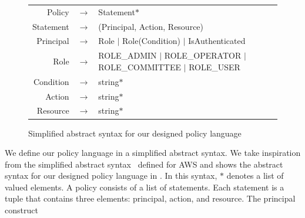 \begin{figure} [btp]
  \small
  \begin{tabular}{rcp{5cm}}
    Policy \hspace*{-3ex}    & $\rightarrow$ & \hspace*{-3ex} Statement$*$                                                      \\
    Statement \hspace*{-3ex} & $\rightarrow$ & \hspace*{-3ex} (Principal, Action, Resource)                                     \\
    Principal \hspace*{-3ex} & $\rightarrow$ & \hspace*{-3ex} Role $|$ Role(Condition) $|$ IsAuthenticated                      \\
    Role \hspace*{-3ex}      & $\rightarrow$ & \hspace*{-3ex} ROLE\_ADMIN $|$ ROLE\_OPERATOR $|$ ROLE\_COMMITTEE $|$ ROLE\_USER \\
    Condition \hspace*{-3ex} & $\rightarrow$ & \hspace*{-3ex} string$*$                                                         \\
    Action \hspace*{-3ex}    & $\rightarrow$ & \hspace*{-3ex} string$*$                                                         \\
    Resource \hspace*{-3ex}  & $\rightarrow$ & \hspace*{-3ex} string$*$                                                         \\
  \end{tabular}
  \caption{Simplified abstract syntax for our designed policy language}
  \label{fig:dsl}
\end{figure}

We define our policy language in a simplified abstract syntax.
%
We take inspiration from the simplified abstract
syntax~\cite{Backes+etal:2018:policy} defined for AWS and shows the abstract
syntax for our designed policy language in .
%
In this syntax, $*$ denotes a list of valued elements.
%
A policy consists of a list of statements.
%
Each statement is a tuple that contains three elements: principal, action, and
resource.
%
The principal construct


